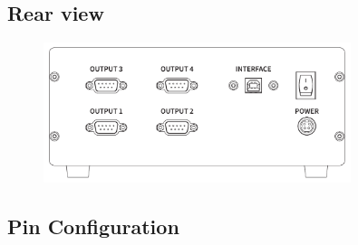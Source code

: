 \documentclass[a4paper, final, 12pt, oneside]{scrartcl}
\numberwithin{equation}{section}
\numberwithin{table}{section}
\numberwithin{figure}{section}
\begin{document}
\subsection*{Rear view}
\begin{figure}[!htp]
  \centering
  \includegraphics[angle=0,origin=c,width=0.8\textwidth]{./drawings/MG22131_back_text.pdf}
\end{figure}
\FloatBarrier

\subsection*{Pin Configuration}
\end{document}
